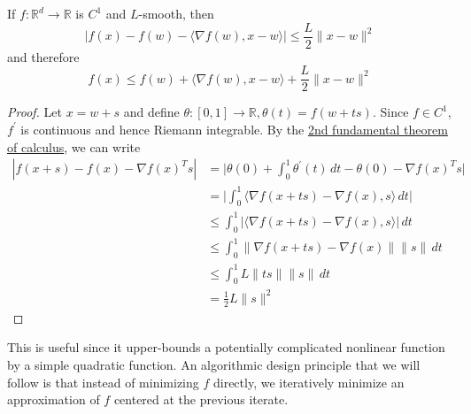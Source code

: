 	\begin{theorem}
		If $f: \mathbb{R}^d \to \mathbb{R}$ is $C^1$ and $L$-smooth, then 
		\begin{equation}
			|f(x) - f(w) - \langle \nabla f(w), x - w \rangle | \leq \frac{L}{2} \|x - w\|^2
		\end{equation}
		and therefore 
		\begin{equation}
			f(x) \leq f(w) + \langle \nabla f(w), x - w \rangle + \frac{L}{2} \|x - w\|^2
		\end{equation}
	\end{theorem}
	\begin{proof}
		Let $x = w + s$ and define $\theta: [0, 1] \to \mathbb{R}, \theta(t) = f(w + ts)$. Since $f \in C^1$, $f^\prime$ is continuous and hence Riemann integrable. By the \hyperref[real-thm:ftc2]{2nd fundamental theorem of calculus}, we can write 
		\begin{align}
			|f(x + s) - f(x) - \nabla f(x)^T s| & = \bigg| \theta(0) + \int_0^1 \theta^\prime (t) \,dt - \theta(0) - \nabla f(x)^T s \bigg|  \\ 
																					& = \bigg| \int_0^1 \langle \nabla f(x + ts) - \nabla f(x), s \rangle \,dt \bigg| \\ 
																					& \leq \int_0^1 | \langle \nabla f(x + ts) - \nabla f(x), s \rangle | \,dt \\ 
																					& \leq \int_0^1 \| \nabla f(x + ts) - \nabla f(x) \| \|s\| \,dt \\ 
																					& \leq \int_0^1 L \|ts\| \|s\|\,dt \\ 
																					& = \frac{1}{2} L \|s\|^2
		\end{align}
	\end{proof}

	This is useful since it upper-bounds a potentially complicated nonlinear function by a simple quadratic function. An algorithmic design principle that we will follow is that instead of minimizing $f$ directly, we iteratively minimize an approximation of $f$ centered at the previous iterate. 

